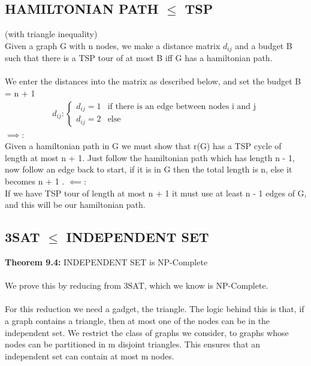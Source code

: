 \subsection{HAMILTONIAN PATH $\le$ TSP}
(with triangle inequality)\\
Given a graph G with n nodes, we make a distance matrix $d_{ij}$ and a budget B such that there is a TSP tour of at most B iff G has a hamiltonian path.\\\\
We enter the distances into the matrix as described below, and set the budget B = n + 1
\begin{gather*}  
d_{ij}: 
\begin{cases}
  d_{ij} = 1 & \text{if there is an edge between nodes i and j}\\    
  d_{ij} = 2 & \text{else}
\end{cases}
\end{gather*}
$\implies$: \\
Given a hamiltonian path in G we must show that r(G) has a TSP cycle of length at most n + 1. Just follow the hamiltonian path which has length n - 1, now follow an edge back to start, if it is in G then the total length is n, else it becomes n + 1 .   
$\impliedby$: \\
If we have TSP tour of length at most n + 1 it must use at least n - 1 edges of G, and this will be our hamiltonian path. 
\subsection{3SAT $\le$ INDEPENDENT SET}
\textbf{Theorem 9.4:} INDEPENDENT SET is NP-Complete\\\\
We prove this by reducing from 3SAT, which we know is NP-Complete.\\\\
For this reduction we need a gadget, the triangle. The logic behind this is that, if a graph contains a triangle, then at most one of the nodes can be in the independent set. We restrict the class of graphs we consider, to graphs whose nodes can be partitioned in m disjoint triangles. This ensures that an independent set can contain at most m nodes. \\

